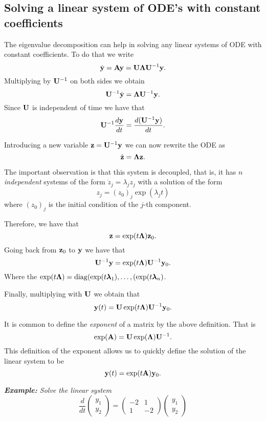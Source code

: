 \documentclass[12pt,legal]{article}
\newcommand{\bfA}{{\bf A}}
\newcommand{\bfU}{{\bf U}}
\newcommand{\bfy}{{\bf y}}
\newcommand{\bfz}{{\bf z}}
\newcommand{\bfLambda}{{\boldsymbol \Lambda}}
\newcommand{\bflambda}{{\boldsymbol \lambda}}
\begin{document}
\subsection{Solving a linear system of ODE's with constant coefficients}

The eigenvalue decomposition can help in solving any linear systems of ODE
with constant coefficients. To do that we write
$$ \dot \bfy = \bfA \bfy =  \bfU \bfLambda \bfU^{-1} \bfy. $$
Multiplying by $\bfU^{-1}$ on both sides we obtain
$$ \bfU^{-1} \dot \bfy = \bfLambda \bfU^{-1} \bfy. $$
Since $\bfU$ is independent of time we have that
$$ \bfU^{-1} {\frac {d\bfy}{dt}} = {\frac {d(\bfU^{-1}\bfy)}{dt}}. $$

Introducing a new variable $\bfz = \bfU^{-1} \bfy$ we can now rewrite the ODE
as
$$ \dot \bfz = \bfLambda \bfz. $$

The important observation is that this system is decoupled, that is, it has $n$ {\em independent} systems of the form $\dot z_j = \lambda_j z_j$
with a solution of the form
$$ z_j = (z_0)_j\exp(\lambda_j t) $$
where $(z_0)_j$ is the initial condition of the $j$-th component.

Therefore, we have that
$$ \bfz = \exp(t \bfLambda) \bfz_0. $$
Going back from $\bfz_0$ to $\bfy$ we have that
$$ \bfU^{-1} \bfy = \exp(t \bfLambda) \bfU^{-1} \bfy_0. $$
Where the $\exp(t \bfLambda) = {\rm diag} (\exp(t \bflambda_1),\ldots,(\exp(t \bflambda_n)$.

Finally, multiplying with $\bfU$ we obtain that
$$ \bfy(t) = \bfU \exp(t \bfLambda) \bfU^{-1} \bfy_0. $$

It is common to define the {\em exponent} of a matrix by the above definition.
That is
$$ \exp(\bfA) =  \bfU \exp(\bfLambda) \bfU^{-1}.$$
This definition of the exponent allows us to quickly define the solution
of the linear system to be
$$ \bfy(t) = \exp(t \bfA)\bfy_0. $$

{\em {\bf {Example:}}
Solve  the linear system
$$ {\frac {d}{dt}} \begin{pmatrix} y_1  \\ y_2 \end{pmatrix} = \begin{pmatrix} -2   & 1  \\ 1  & -2 \end{pmatrix}
\begin{pmatrix} y_1  \\ y_2 \end{pmatrix}
 $$}
\end{document}

